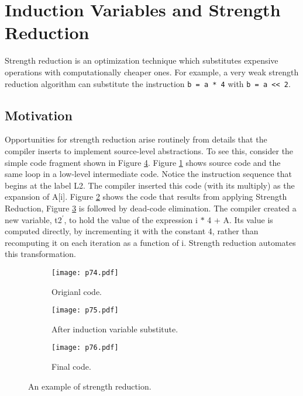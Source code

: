\newpage

\section{Induction Variables and Strength Reduction}
Strength reduction is an optimization technique which substitutes expensive operations with computationally cheaper ones. For example, a very weak strength reduction algorithm can substitute the instruction 
\texttt{b = a * 4} with \texttt{b = a << 2}.

\subsection{Motivation}

Opportunities for strength reduction arise routinely from details that the compiler
inserts to implement source-level abstractions. To see this, consider the simple
code fragment shown in Figure \ref{fig:p74-76}. Figure \ref{fig:p74} shows source code and the same loop in a low-level intermediate code.
 Notice the instruction sequence that begins at the label L2. The compiler inserted this code
(with its multiply) as the expansion of A[i]. Figure \ref{fig:p75}  shows the code that results from applying Strength Reduction,
Figure \ref{fig:p76} is followed by dead-code elimination. The compiler created a new variable, t2$^\prime$, to
hold the value of the expression i $*$ 4 + A. Its value is computed directly, by
incrementing it with the constant 4, rather than recomputing it on each iteration
as a function of i. Strength reduction automates this transformation. 

\begin{figure}[H]
    \centering
    \begin{subfigure}{0.6\textwidth}
    \centering
        \texttt{[image: p74.pdf]}
        \caption{Origianl code.}
        \label{fig:p74}
    \end{subfigure}
    \begin{subfigure}{0.6\textwidth}
    \centering
        \texttt{[image: p75.pdf]}
        \caption{After induction variable substitute.}
        \label{fig:p75}
    \end{subfigure}
    \begin{subfigure}{0.6\textwidth}
        \centering
            \texttt{[image: p76.pdf]}
            \caption{Final code.}
            \label{fig:p76}
        \end{subfigure}
    \caption{An example of strength reduction.}
       \label{fig:p74-76}
\end{figure}



